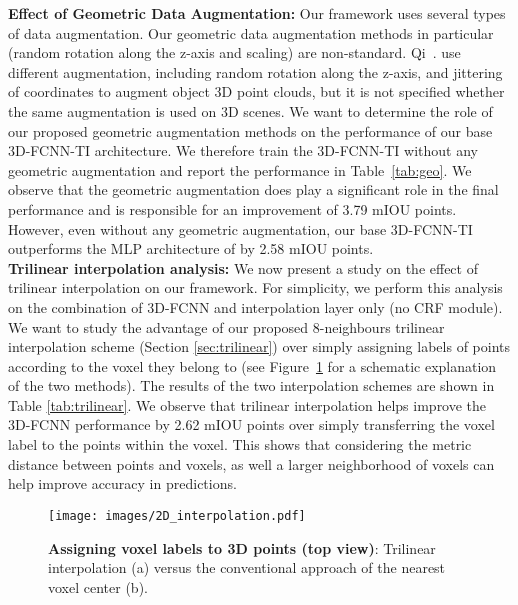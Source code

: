 \documentclass[10pt,twocolumn,letterpaper]{article}
\newcommand{\threedfcnn}[0]{3D-FCNN\xspace}
\newcommand{\crf}[0]{CRF\xspace}
\begin{document}
\textbf{Effect of Geometric Data Augmentation:} Our framework uses several types of data augmentation. Our geometric data augmentation methods in particular (random  rotation along the z-axis and scaling) are non-standard. Qi~\etal. \cite{DBLP:journals/corr/QiSMG16} use  different augmentation, including random rotation along the z-axis, and jittering of  coordinates to augment object 3D point clouds, but it is not specified whether the same augmentation is used on 3D scenes. We want to determine the role of our proposed geometric augmentation methods on the performance of our base \threedfcnn-TI architecture. We therefore train the \threedfcnn-TI without any geometric augmentation and report the performance in Table~\ref{tab:geo}. We observe that the geometric augmentation does play a significant role in the final performance and is responsible for an improvement of 3.79 mIOU points. However, even without any geometric augmentation, our base \threedfcnn-TI outperforms the MLP architecture of \cite{DBLP:journals/corr/QiSMG16} by 2.58 mIOU points.\\

\textbf{Trilinear interpolation analysis:} We now present a study on the effect of trilinear interpolation on our framework. For simplicity, we perform this analysis on the combination of \threedfcnn and interpolation layer only (no \crf module). We want to study the advantage of our proposed 8-neighbours trilinear interpolation scheme (Section \ref{sec:trilinear}) over simply assigning labels of points according to the voxel they belong to (see Figure~\ref{fig:2DInterpol} for a schematic explanation of the two methods). The results of the two interpolation schemes are shown in Table \ref{tab:trilinear}. We observe that trilinear interpolation helps improve the \threedfcnn performance by 2.62 mIOU points over simply transferring the voxel label to the points within the voxel. This shows that considering the metric distance between points and voxels, as well a larger neighborhood of voxels can help improve accuracy in predictions.

\begin{figure}[t]
\centering
\texttt{[image: images/2D\_interpolation.pdf]}
\captionsetup{justification=centering}
\caption{\small{\textbf{Assigning voxel labels to 3D points (top view)}: Trilinear interpolation (a) versus the conventional approach of the nearest voxel center (b).}}
\label{fig:2DInterpol}
\vspace{-4mm}
\end{figure}  
\end{document}
